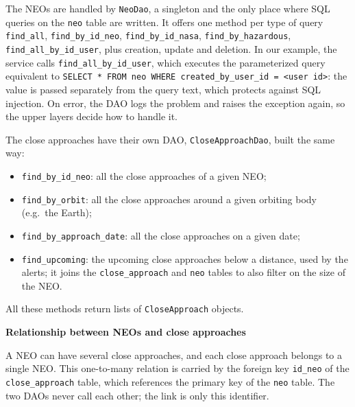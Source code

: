 \documentclass[
  french,
  11pt,
  a4paper,
]{report}
\providecommand{\tightlist}{%
  \setlength{\itemsep}{0pt}\setlength{\parskip}{0pt}}
\begin{document}
The NEOs are handled by \texttt{NeoDao}, a singleton and the only place
where SQL queries on the \texttt{neo} table are written. It offers one
method per type of query \texttt{find\_all}, \texttt{find\_by\_id\_neo},
\texttt{find\_by\_id\_nasa}, \texttt{find\_by\_hazardous},
\texttt{find\_all\_by\_id\_user}, plus creation, update and deletion. In
our example, the service calls \texttt{find\_all\_by\_id\_user}, which
executes the parameterized query equivalent to
\texttt{SELECT\ *\ FROM\ neo\ WHERE\ created\_by\_user\_id\ =\ \textless{}user\ id\textgreater{}}:
the value is passed separately from the query text, which protects
against SQL injection. On error, the DAO logs the problem and raises the
exception again, so the upper layers decide how to handle it.

The close approaches have their own DAO, \texttt{CloseApproachDao},
built the same way:

\begin{itemize}
\tightlist
\item
  \texttt{find\_by\_id\_neo}: all the close approaches of a given NEO;
\item
  \texttt{find\_by\_orbit}: all the close approaches around a given
  orbiting body (e.g.~the Earth);
\item
  \texttt{find\_by\_approach\_date}: all the close approaches on a given
  date;
\item
  \texttt{find\_upcoming}: the upcoming close approaches below a
  distance, used by the alerts; it joins the \texttt{close\_approach}
  and \texttt{neo} tables to also filter on the size of the NEO.
\end{itemize}

All these methods return lists of \texttt{CloseApproach} objects.

\textbf{Relationship between NEOs and close approaches}

A NEO can have several close approaches, and each close approach belongs
to a single NEO. This one-to-many relation is carried by the foreign key
\texttt{id\_neo} of the \texttt{close\_approach} table, which references
the primary key of the \texttt{neo} table. The two DAOs never call each
other; the link is only this identifier.
\end{document}
